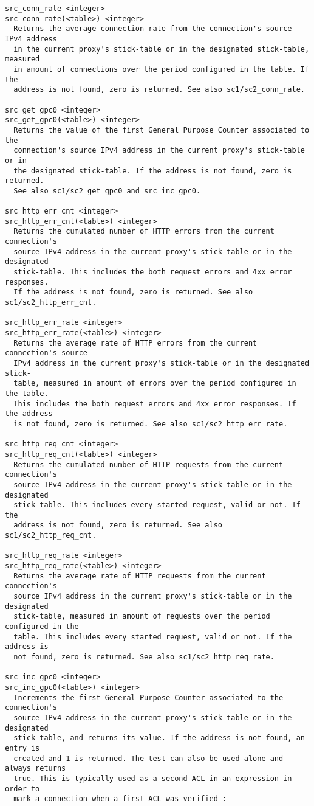 \begin{verbatim}
src_conn_rate <integer>
src_conn_rate(<table>) <integer>
  Returns the average connection rate from the connection's source IPv4 address
  in the current proxy's stick-table or in the designated stick-table, measured
  in amount of connections over the period configured in the table. If the
  address is not found, zero is returned. See also sc1/sc2_conn_rate.

src_get_gpc0 <integer>
src_get_gpc0(<table>) <integer>
  Returns the value of the first General Purpose Counter associated to the
  connection's source IPv4 address in the current proxy's stick-table or in
  the designated stick-table. If the address is not found, zero is returned.
  See also sc1/sc2_get_gpc0 and src_inc_gpc0.

src_http_err_cnt <integer>
src_http_err_cnt(<table>) <integer>
  Returns the cumulated number of HTTP errors from the current connection's
  source IPv4 address in the current proxy's stick-table or in the designated
  stick-table. This includes the both request errors and 4xx error responses.
  If the address is not found, zero is returned. See also sc1/sc2_http_err_cnt.

src_http_err_rate <integer>
src_http_err_rate(<table>) <integer>
  Returns the average rate of HTTP errors from the current connection's source
  IPv4 address in the current proxy's stick-table or in the designated stick-
  table, measured in amount of errors over the period configured in the table.
  This includes the both request errors and 4xx error responses. If the address
  is not found, zero is returned. See also sc1/sc2_http_err_rate.

src_http_req_cnt <integer>
src_http_req_cnt(<table>) <integer>
  Returns the cumulated number of HTTP requests from the current connection's
  source IPv4 address in the current proxy's stick-table or in the designated
  stick-table. This includes every started request, valid or not. If the
  address is not found, zero is returned. See also sc1/sc2_http_req_cnt.

src_http_req_rate <integer>
src_http_req_rate(<table>) <integer>
  Returns the average rate of HTTP requests from the current connection's
  source IPv4 address in the current proxy's stick-table or in the designated
  stick-table, measured in amount of requests over the period configured in the
  table. This includes every started request, valid or not. If the address is
  not found, zero is returned. See also sc1/sc2_http_req_rate.

src_inc_gpc0 <integer>
src_inc_gpc0(<table>) <integer>
  Increments the first General Purpose Counter associated to the connection's
  source IPv4 address in the current proxy's stick-table or in the designated
  stick-table, and returns its value. If the address is not found, an entry is
  created and 1 is returned. The test can also be used alone and always returns
  true. This is typically used as a second ACL in an expression in order to
  mark a connection when a first ACL was verified :


\end{verbatim}

